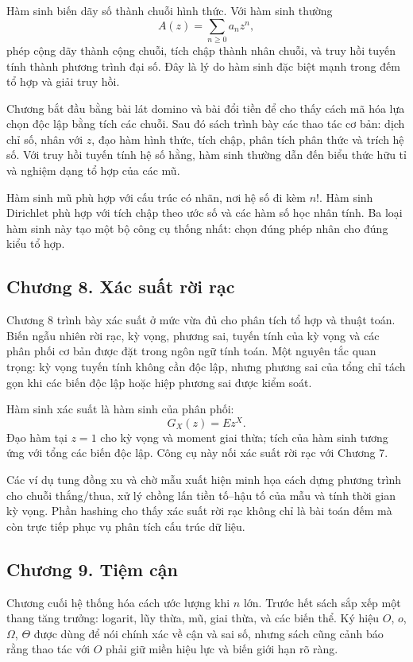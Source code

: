 \documentclass[11pt]{article}
\begin{document}
Hàm sinh biến dãy số thành chuỗi hình thức. Với hàm sinh thường
\[
  A(z)=\sum_{n\ge0} a_n z^n,
\]
phép cộng dãy thành cộng chuỗi, tích chập thành nhân chuỗi, và truy hồi tuyến
tính thành phương trình đại số. Đây là lý do hàm sinh đặc biệt mạnh trong đếm
tổ hợp và giải truy hồi.

Chương bắt đầu bằng bài lát domino và bài đổi tiền để cho thấy cách mã hóa lựa
chọn độc lập bằng tích các chuỗi. Sau đó sách trình bày các thao tác cơ bản:
dịch chỉ số, nhân với \(z\), đạo hàm hình thức, tích chập, phân tích phân thức
và trích hệ số. Với truy hồi tuyến tính hệ số hằng, hàm sinh thường dẫn đến
biểu thức hữu tỉ và nghiệm dạng tổ hợp của các mũ.

Hàm sinh mũ phù hợp với cấu trúc có nhãn, nơi hệ số đi kèm \(n!\). Hàm sinh
Dirichlet phù hợp với tích chập theo ước số và các hàm số học nhân tính. Ba
loại hàm sinh này tạo một bộ công cụ thống nhất: chọn đúng phép nhân cho đúng
kiểu tổ hợp.

\subsection*{Chương 8. Xác suất rời rạc}

Chương 8 trình bày xác suất ở mức vừa đủ cho phân tích tổ hợp và thuật toán.
Biến ngẫu nhiên rời rạc, kỳ vọng, phương sai, tuyến tính của kỳ vọng và các
phân phối cơ bản được đặt trong ngôn ngữ tính toán. Một nguyên tắc quan trọng:
kỳ vọng tuyến tính không cần độc lập, nhưng phương sai của tổng chỉ tách gọn
khi các biến độc lập hoặc hiệp phương sai được kiểm soát.

Hàm sinh xác suất là hàm sinh của phân phối:
\[
  G_X(z)=E z^X.
\]
Đạo hàm tại \(z=1\) cho kỳ vọng và moment giai thừa; tích của hàm sinh tương
ứng với tổng các biến độc lập. Công cụ này nối xác suất rời rạc với Chương 7.

Các ví dụ tung đồng xu và chờ mẫu xuất hiện minh họa cách dựng phương trình
cho chuỗi thắng/thua, xử lý chồng lấn tiền tố--hậu tố của mẫu và tính thời gian
kỳ vọng. Phần hashing cho thấy xác suất rời rạc không chỉ là bài toán đếm mà
còn trực tiếp phục vụ phân tích cấu trúc dữ liệu.

\subsection*{Chương 9. Tiệm cận}

Chương cuối hệ thống hóa cách ước lượng khi \(n\) lớn. Trước hết sách sắp xếp
một thang tăng trưởng: logarit, lũy thừa, mũ, giai thừa, và các biến thể. Ký
hiệu \(O\), \(o\), \(\Omega\), \(\Theta\) được dùng để nói chính xác về cận và
sai số, nhưng sách cũng cảnh báo rằng thao tác với \(O\) phải giữ miền hiệu
lực và biến giới hạn rõ ràng.
\end{document}
